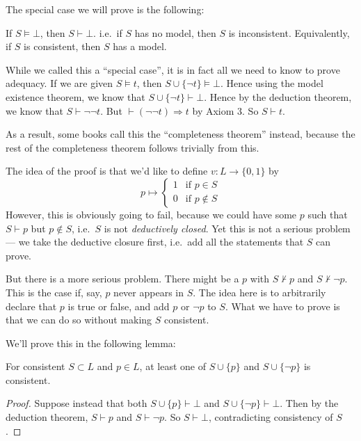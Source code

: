 \documentclass[a4paper]{article}
\begin{document}
The special case we will prove is the following:
\begin{thm}
  If $S\models \bot$, then $S\vdash \bot$. i.e.\ if $S$ has no model, then $S$ is inconsistent. Equivalently, if $S$ is consistent, then $S$ has a model.
\end{thm}

While we called this a ``special case'', it is in fact all we need to know to prove adequacy. If we are given $S\models t$, then $S\cup \{\neg t\} \models \bot$. Hence using the model existence theorem, we know that $S\cup \{\neg t\} \vdash \bot$. Hence by the deduction theorem, we know that $S\vdash \neg \neg t$. But $\vdash (\neg\neg t)\Rightarrow t$ by Axiom 3. So $S\vdash t$.

As a result, some books call this the ``completeness theorem'' instead, because the rest of the completeness theorem follows trivially from this.

The idea of the proof is that we'd like to define $v: L \to \{0, 1\}$ by
\[
  p\mapsto
  \begin{cases}
    1 & \text{if } p\in S\\
    0 & \text{if } p\not\in S
  \end{cases}
\]
However, this is obviously going to fail, because we could have some $p$ such that $S\vdash p$ but $p\not\in S$, i.e.\ $S$ is not \emph{deductively closed}. Yet this is not a serious problem --- we take the deductive closure first, i.e.\ add all the statements that $S$ can prove.

But there is a more serious problem. There might be a $p$ with $S\not\vdash p$ and $S\not\vdash \neg p$. This is the case if, say, $p$ never appears in $S$. The idea here is to arbitrarily declare that $p$ is true or false, and add $p$ or $\neg p$ to $S$. What we have to prove is that we can do so without making $S$ consistent.

We'll prove this in the following lemma:
\begin{lemma}
  For consistent $S\subset L$ and $p\in L$, at least one of $S\cup \{p\}$ and $S\cup \{\neg p\}$ is consistent.
\end{lemma}

\begin{proof}
  Suppose instead that both $S\cup \{p\} \vdash \bot$ and $S\cup \{\neg p\}\vdash \bot$. Then by the deduction theorem, $S\vdash p$ and $S\vdash \neg p$. So $S\vdash \bot$, contradicting consistency of $S$.
\end{proof}
\end{document}
